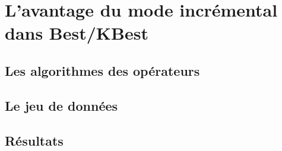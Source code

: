 \section{L'avantage du mode incrémental dans Best/KBest}\label{sec:valid:perfs:prefs}
\subsection{Les algorithmes des opérateurs}
\subsection{Le jeu de données}
\subsection{Résultats}
